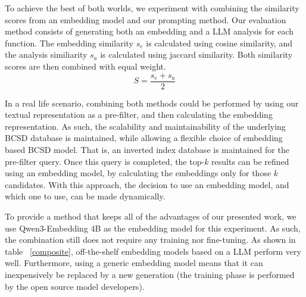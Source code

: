 To achieve the best of both worlds, we experiment with combining the similarity scores from an embedding model and our prompting method.
Our evaluation method consists of generating both an embedding and a LLM analysis for each function. The embedding similarity \(s_e\) is calculated
using cosine similarity, and the analysis similiarity \(s_a\) is calculated using jaccard similarity. Both similarity scores are then combined
with equal weight.
\[
    S = \frac{s_e + s_a}{2}
\]

In a real life scenario, combining both methods could be performed by using our textual representation as a pre-filter, and then calculating
the embedding representation. As such, the scalability and maintainability of the underlying BCSD database is maintained, while allowing a flexible
choice of embedding based BCSD model. That is, an inverted index database is maintained for the pre-filter query. Once this query is completed, the
top-\(k\) results can be refined using an embedding model, by calculating the embeddings only for those \(k\) candidates. With this approach,
the decision to use an embedding model, and which one to use, can be made dynamically.

To provide a method that keeps all of the advantages of our presented work, we use Qwen3-Embedding 4B as the embedding model for this experiment.
As such, the combination still does not require any training nor fine-tuning. As shown in table ~\ref{composite}, off-the-shelf embedding models
based on a LLM perform very well. Furthermore, using a generic embedding model means that it can inexpensively be replaced by a new generation
(the training phase is performed by the open source model developers).

